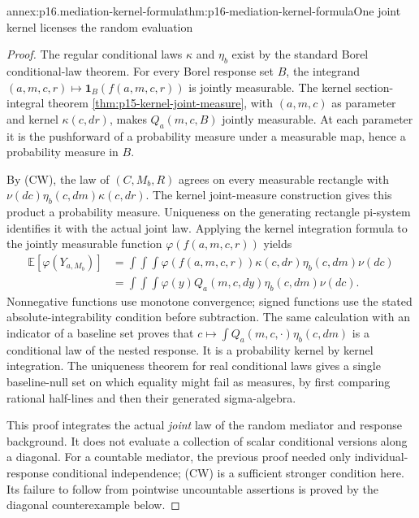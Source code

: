 \begin{annexitem}{annex:p16.mediation-kernel-formula}{thm:p16-mediation-kernel-formula}{One joint kernel licenses the random evaluation}
\begin{proof}
The regular conditional laws \(\kappa\) and \(\eta_b\) exist by the
standard Borel conditional-law theorem. For every Borel response set
\(B\), the integrand \((a,m,c,r)\mapsto\mathbf1_B(f(a,m,c,r))\)
is jointly measurable. The kernel section-integral theorem
\cref{thm:p15-kernel-joint-measure}, with \((a,m,c)\) as parameter and
kernel \(\kappa(c,dr)\), makes \(Q_a(m,c,B)\) jointly measurable.
At each parameter it is the pushforward of a probability measure under
a measurable map, hence a probability measure in \(B\).

By (CW), the law of \((C,M_b,R)\) agrees on every measurable rectangle
with \(\nu(dc)\eta_b(c,dm)\kappa(c,dr)\). The kernel joint-measure
construction gives this product a probability measure. Uniqueness on
the generating rectangle pi-system identifies it with the actual joint
law. Applying the kernel integration formula to the jointly measurable
function \(\varphi(f(a,m,c,r))\) yields
\[
\begin{aligned}
 \mathbb E[\varphi(Y_{a,M_b})]
 &=\int\!\int\!\int
       \varphi(f(a,m,c,r))\kappa(c,dr)\eta_b(c,dm)\nu(dc)\\
 &=\int\!\int\!\int\varphi(y)Q_a(m,c,dy)\eta_b(c,dm)\nu(dc).
\end{aligned}
\]
Nonnegative functions use monotone convergence; signed functions use
the stated absolute-integrability condition before subtraction.
The same calculation with an indicator of a baseline set proves that
\(c\mapsto\int Q_a(m,c,\cdot)\eta_b(c,dm)\) is a conditional law
of the nested response. It is a probability kernel by kernel integration.
The uniqueness theorem for real conditional laws gives a single
baseline-null set on which equality might fail as measures, by first
comparing rational half-lines and then their generated sigma-algebra.

This proof integrates the actual \emph{joint} law of the random mediator
and response background. It does not evaluate a collection of scalar
conditional versions along a diagonal. For a countable mediator, the
previous proof needed only individual-response conditional independence;
(CW) is a sufficient stronger condition here. Its failure to follow
from pointwise uncountable assertions is proved by the diagonal
counterexample below.
\end{proof}
\end{annexitem}

